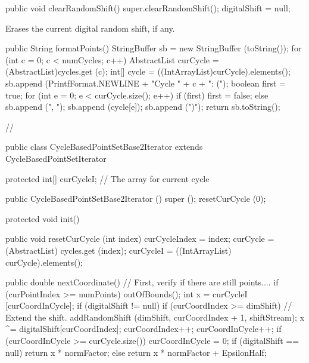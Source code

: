 \begin{hide}\begin{code}

   public void clearRandomShift() {
      super.clearRandomShift();
      digitalShift = null;
   }
\end{code}
\begin{tabb}
   Erases the current digital random shift, if any.
\end{tabb}\end{hide}
\begin{code}
\begin{hide}

   public String formatPoints() {
      StringBuffer sb = new StringBuffer (toString());
      for (int c = 0; c < numCycles; c++) {
         AbstractList curCycle = (AbstractList)cycles.get (c);
         int[] cycle = ((IntArrayList)curCycle).elements();
         sb.append (PrintfFormat.NEWLINE + "Cycle " + c + ": (");
         boolean first = true;
         for (int e = 0; e < curCycle.size(); e++) {
            if (first)
               first = false;
            else
               sb.append (", ");
            sb.append (cycle[e]);
         }
         sb.append (")");
      }
      return sb.toString();
   }

   // %

   public class CycleBasedPointSetBase2Iterator
                   extends CycleBasedPointSetIterator {

      protected int[] curCycleI;          // The array for current cycle

      public CycleBasedPointSetBase2Iterator () {
         super ();
         resetCurCycle (0);
      }

      protected void init() { }

      public void resetCurCycle (int index) {
         curCycleIndex = index;
         curCycle = (AbstractList) cycles.get (index);
         curCycleI = ((IntArrayList) curCycle).elements();
      }

      public double nextCoordinate() {
          // First, verify if there are still points....
          if (curPointIndex >= numPoints)
             outOfBounds();
          int x = curCycleI [curCoordInCycle];
          if (digitalShift != null) {
             if (curCoordIndex >= dimShift)   // Extend the shift.
                addRandomShift (dimShift, curCoordIndex + 1, shiftStream);
             x ^= digitalShift[curCoordIndex];
          }
          curCoordIndex++;
          curCoordInCycle++;
          if (curCoordInCycle >= curCycle.size())
             curCoordInCycle = 0;
          if (digitalShift == null)
             return x * normFactor;
          else
             return x * normFactor + EpsilonHalf;
     }

}
\end{hide}
\end{code}
